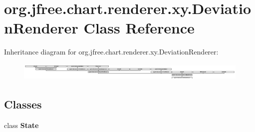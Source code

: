 \hypertarget{classorg_1_1jfree_1_1chart_1_1renderer_1_1xy_1_1_deviation_renderer}{}\section{org.\+jfree.\+chart.\+renderer.\+xy.\+Deviation\+Renderer Class Reference}
\label{classorg_1_1jfree_1_1chart_1_1renderer_1_1xy_1_1_deviation_renderer}
Inheritance diagram for org.\+jfree.\+chart.\+renderer.\+xy.\+Deviation\+Renderer\+:\begin{figure}[H]
\begin{center}
\leavevmode
\includegraphics[height=0.845922cm]{classorg_1_1jfree_1_1chart_1_1renderer_1_1xy_1_1_deviation_renderer}
\end{center}
\end{figure}
\subsection*{Classes}
\begin{DoxyCompactItemize}
\item 
class {\bfseries State}
\end{DoxyCompactItemize}
